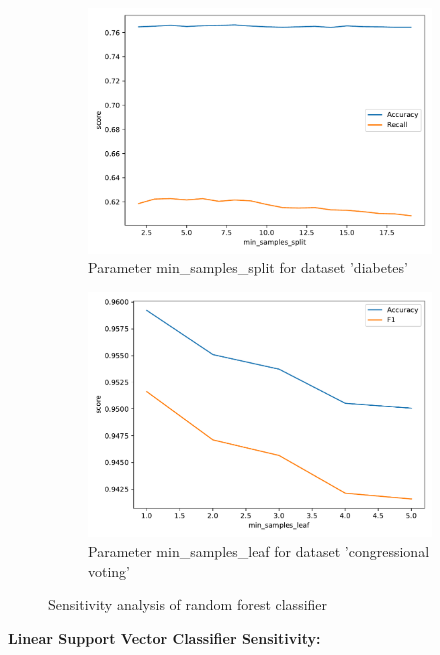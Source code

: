 \documentclass[a4paper,10pt]{article}
\begin{document}
\begin{figure}[h!]
\begin{subfigure}[b]{0.45\textwidth}
        \includegraphics[width=\textwidth]{diabetes/plots/rf_min_samples_split_sensitivity.pdf}
        \caption{Parameter \textsf{min\_samples\_split} for dataset 'diabetes'}
    \end{subfigure}
    \hfill
    \begin{subfigure}[b]{0.45\textwidth}
        \includegraphics[width=\textwidth]{congress/plots/RandomForestClassifier_min_samples_leaf_sensitivity.pdf}
        \caption{Parameter \textsf{min\_samples\_leaf} for dataset 'congressional voting'}
    \end{subfigure}
    \caption{Sensitivity analysis of random forest classifier}
    \label{fig: sensitivity rf}
\end{figure}


\textbf{Linear Support Vector Classifier Sensitivity:}
\end{document}
